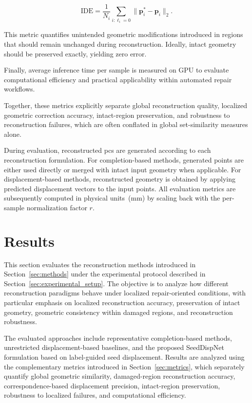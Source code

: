 \begin{equation}
\mathrm{IDE} =
\frac{1}{N_i}
\sum_{i:\ell_i=0}
\|\mathbf{p}_i^* - \mathbf{p}_i\|_2.
\end{equation}

This metric quantifies unintended geometric modifications introduced in regions that should remain unchanged during reconstruction. Ideally, intact geometry should be preserved exactly, yielding zero error.

Finally, average inference time per sample is measured on GPU to evaluate computational efficiency and practical applicability within automated repair workflows.

Together, these metrics explicitly separate global reconstruction quality, localized geometric correction accuracy, intact-region preservation, and robustness to reconstruction failures, which are often conflated in global set-similarity measures alone.

During evaluation, reconstructed \acp{pc} are generated according to each reconstruction formulation. For completion-based methods, generated points are either used directly or merged with intact input geometry when applicable. For displacement-based methods, reconstructed geometry is obtained by applying predicted displacement vectors to the input points. All evaluation metrics are subsequently computed in physical units~(mm) by scaling back with the per-sample normalization factor $r$.

\section{Results}
\label{sec:results}

This section evaluates the reconstruction methods introduced in Section~\ref{sec:methods} under the experimental protocol described in Section~\ref{sec:experimental_setup}. The objective is to analyze how different reconstruction paradigms behave under localized repair-oriented conditions, with particular emphasis on localized reconstruction accuracy, preservation of intact geometry, geometric consistency within damaged regions, and reconstruction robustness.

The evaluated approaches include representative completion-based methods, unrestricted displacement-based baselines, and the proposed SeedDispNet formulation based on label-guided seed displacement. Results are analyzed using the complementary metrics introduced in Section~\ref{sec:metrics}, which separately quantify global geometric similarity, damaged-region reconstruction accuracy, correspondence-based displacement precision, intact-region preservation, robustness to localized failures, and computational efficiency.

